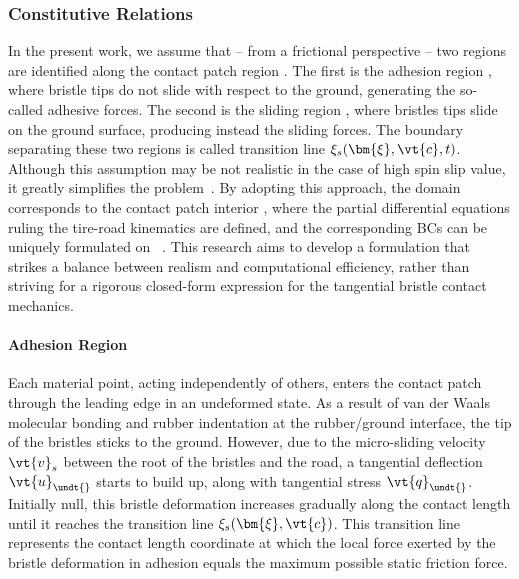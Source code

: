 
\subsubsection{Constitutive Relations}
\label{app3:sec:constitutive_relations}

In the present work, we assume that -- from a frictional perspective -- two regions are identified along the contact patch region \cp{}. The first is the adhesion region \adh{}, where bristle tips do not slide with respect to the ground, generating the so-called adhesive forces. The second is the sliding region \sli{}, where bristles tips slide on the ground surface, producing instead the sliding forces. The boundary separating these two regions is called transition line $\xi_s(\bm{\xi},\vt{c},t)$. Although this assumption may be not realistic in the case of high spin slip value, it greatly simplifies the problem~\cite{romano2022advanced}. By adopting this approach, the domain corresponds to the contact patch interior , where the partial differential equations ruling the tire-road kinematics are defined, and the corresponding \acp{BC} can be uniquely formulated on ~\cite{romano2022analytical}. This research aims to develop a formulation that strikes a balance between realism and computational efficiency, rather than striving for a rigorous closed-form expression for the tangential bristle contact mechanics.

\paragraph{Adhesion Region}

Each material point, acting independently of others, enters the contact patch through the leading edge in an undeformed state.  As a result of van der Waals molecular bonding and rubber indentation at the rubber/ground interface, the tip of the bristles sticks to the ground. However, due to the micro-sliding velocity $\vt{v}_s$ between the root of the bristles and the road, a tangential deflection $\vt{u}_{\undt{}}$ starts to build up, along with tangential stress $\vt{q}_{\undt{}}$. Initially null, this bristle deformation increases gradually along the contact length until it reaches the transition line $\xi_s(\bm{\xi},\vt{c})$. This transition line represents the contact length coordinate at which the local force exerted by the bristle deformation in adhesion equals the maximum possible static friction force.

